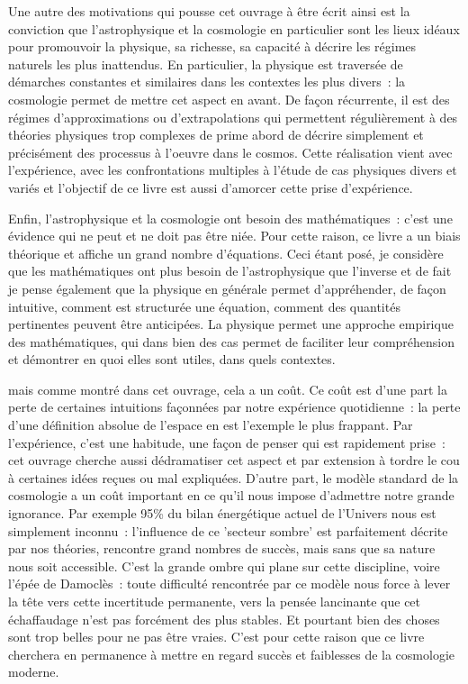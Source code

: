 Une autre des motivations qui pousse cet ouvrage à être écrit ainsi est la conviction que l'astrophysique et la cosmologie en particulier sont les lieux idéaux pour promouvoir la physique, sa richesse, sa capacité à décrire les régimes naturels les plus inattendus. En particulier, la physique est traversée de démarches constantes et similaires dans les contextes les plus divers~: la cosmologie permet de mettre cet aspect en avant. De façon récurrente, il est des régimes d'approximations ou d'extrapolations qui permettent régulièrement à des théories physiques trop complexes de prime abord de décrire simplement et précisément des processus à l'oeuvre dans le cosmos. Cette réalisation vient avec l'expérience, avec les confrontations multiples à l'étude de cas physiques divers et variés et l'objectif de ce livre est aussi d'amorcer cette prise d'expérience.

Enfin, l'astrophysique et la cosmologie ont besoin des mathématiques~: c'est une évidence qui ne peut et ne doit pas être niée. Pour cette raison, ce livre a un biais théorique et affiche un grand nombre d'équations. Ceci étant posé, je considère que les mathématiques ont plus besoin de l'astrophysique que l'inverse et de fait je pense également que la physique en générale permet d'appréhender, de façon intuitive, comment est structurée une équation, comment des quantités pertinentes peuvent être anticipées. La physique permet une approche empirique des mathématiques, qui dans bien des cas permet de faciliter leur compréhension et démontrer en quoi elles sont utiles, dans quels contextes.

 mais comme montré dans cet ouvrage, cela a un coût. Ce coût est d'une part la perte de certaines intuitions façonnées par notre expérience quotidienne~: la perte d'une définition absolue de l'espace en est l'exemple le plus frappant. Par l'expérience, c'est une habitude, une façon de penser qui est rapidement prise~: cet ouvrage cherche aussi dédramatiser cet aspect et par extension à tordre le cou à certaines idées reçues ou mal expliquées. D'autre part, le modèle standard de la cosmologie a un coût important en ce qu'il nous impose d'admettre notre grande ignorance. Par exemple 95\% du bilan énergétique actuel de l'Univers nous est simplement inconnu~: l'influence de ce 'secteur sombre' est parfaitement décrite par nos théories, rencontre grand nombres de succès, mais sans que sa nature nous soit accessible. C'est la grande ombre qui plane sur cette discipline, voire l'épée de Damoclès~: toute difficulté rencontrée par ce modèle nous force à lever la tête vers cette incertitude permanente, vers la pensée lancinante que cet échaffaudage n'est pas forcément des plus stables. Et pourtant bien des choses sont trop belles pour ne pas être vraies. C'est pour cette raison que ce livre cherchera en permanence à mettre en regard succès et faiblesses de la cosmologie moderne.

